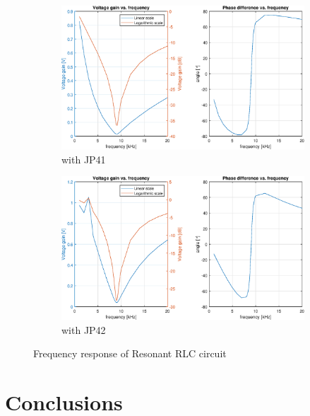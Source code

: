 \documentclass[notitlepage, a4paper, 11pt]{article}
\begin{document}
	\begin{figure}[H]
		\centering
		\begin{subfigure}{0.49\textwidth}
			\includegraphics[width=\textwidth]{../Matlab/img/131.eps}
			\caption{with JP41}
		\end{subfigure}
		\hfill
		\begin{subfigure}{0.49\textwidth}
			\includegraphics[width=\textwidth]{../Matlab/img/132.eps}
			\caption{with JP42}
		\end{subfigure}
		\caption{Frequency response of Resonant RLC circuit}
	\end{figure}
	\section{Conclusions}
	
\end{document}
